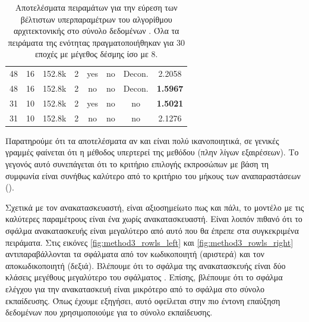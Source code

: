 \begin{table}[H]
\begin{center}
{\begin{tabular}{c c c c c c c c}
            48 & 16 & 152.8k & 2 & yes & no & Decon. & 2.2058 \\ %
            48 & 16 & 152.8k & 2 & no & no & Decon. & \textbf{1.5967}\\ %

            31 & 10 & 152.8k & 2 & yes & no & no & \textbf{1.5021}\\%
            31 & 10 & 152.8k & 2 & no & no & no & 2.1276\\%

            \bottomrule
        \end{tabular}
        }
    \end{center}
    \caption[]{\label{tab:method_3_hyper_tuning_RoWLS}Αποτελέσματα πειραμάτων για την εύρεση των βέλτιστων υπερπαραμέτρων του αλγορίθμου  αρχιτεκτονικής  στο σύνολο δεδομένων . Όλα τα πειράματα της ενότητας πραγματοποιήθηκαν για 30 εποχές με μέγεθος δέσμης ίσο με 8.} 
\end{table}
Παρατηρούμε ότι τα αποτελέσματα αν και είναι πολύ ικανοποιητικά, σε γενικές γραμμές φαίνεται ότι η μέθοδος  υπερτερεί της μεθόδου  (πλην λίγων εξαιρέσεων). Το γεγονός αυτό συνεπάγεται ότι το κριτήριο επιλογής εκπροσώπων με βάση τη συμφωνία είναι συνήθως καλύτερο από το κριτήριο του μήκους των αναπαραστάσεων ().\par

Σχετικά με τον ανακατασκευαστή, είναι αξιοσημείωτο πως και πάλι, το μοντέλο με τις καλύτερες παραμέτρους είναι ένα χωρίς ανακατασκευαστή. Είναι λοιπόν πιθανό ότι το σφάλμα ανακατασκευής είναι μεγαλύτερο από αυτό που θα έπρεπε στα συγκεκριμένα πειράματα. Στις εικόνες \ref{fig:method3_rowls_left} και \ref{fig:method3_rowls_right} αντιπαραβάλλονται τα σφάλματα από τον κωδικοποιητή (αριστερά) και τον αποκωδικοποιητή (δεξιά). Βλέπουμε ότι το σφάλμα της ανακατασκευής είναι δύο κλάσεις μεγέθους μεγαλύτερο του σφάλματος . Επίσης, βλέπουμε ότι το σφάλμα ελέγχου για την ανακατασκευή είναι μικρότερο από το σφάλμα στο σύνολο εκπαίδευσης. Όπως έχουμε εξηγήσει, αυτό οφείλεται στην πιο έντονη επαύξηση δεδομένων που χρησιμοποιούμε για το σύνολο εκπαίδευσης.

